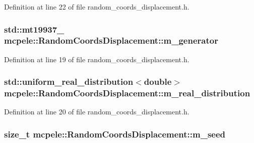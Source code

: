 \-Definition at line 22 of file random\-\_\-coords\-\_\-displacement.\-h.

\hypertarget{classmcpele_1_1RandomCoordsDisplacement_a6301d7fc89a1943a5fb7c870f25fe2a2}{
\subsubsection[{m\-\_\-generator}]{\setlength{\rightskip}{0pt plus 5cm}std\-::mt19937\-\_ {\bf mcpele\-::\-Random\-Coords\-Displacement\-::m\-\_\-generator}}}\label{classmcpele_1_1RandomCoordsDisplacement_a6301d7fc89a1943a5fb7c870f25fe2a2}


\-Definition at line 19 of file random\-\_\-coords\-\_\-displacement.\-h.

\hypertarget{classmcpele_1_1RandomCoordsDisplacement_a8d3de3a3e1b9595baf9618bf1530c5e2}{
\subsubsection[{m\-\_\-real\-\_\-distribution}]{\setlength{\rightskip}{0pt plus 5cm}std\-::uniform\-\_\-real\-\_\-distribution$<$double$>$ {\bf mcpele\-::\-Random\-Coords\-Displacement\-::m\-\_\-real\-\_\-distribution}}}\label{classmcpele_1_1RandomCoordsDisplacement_a8d3de3a3e1b9595baf9618bf1530c5e2}


\-Definition at line 20 of file random\-\_\-coords\-\_\-displacement.\-h.

\hypertarget{classmcpele_1_1RandomCoordsDisplacement_a1b60fa629821ec194d0d153716d26f73}{
\subsubsection[{m\-\_\-seed}]{\setlength{\rightskip}{0pt plus 5cm}size\-\_\-t {\bf mcpele\-::\-Random\-Coords\-Displacement\-::m\-\_\-seed}}}\label{classmcpele_1_1RandomCoordsDisplacement_a1b60fa629821ec194d0d153716d26f73}


